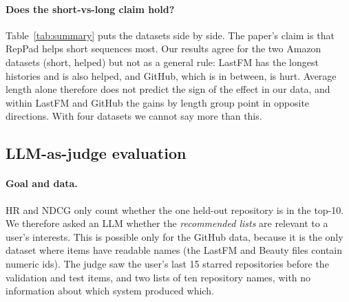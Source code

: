 \documentclass[11pt]{article}
\begin{document}
\paragraph{Does the short-vs-long claim hold?}
Table~\ref{tab:summary} puts the datasets side by side. The paper's claim is that RepPad helps short
sequences most. Our results agree for the two Amazon datasets (short, helped) but not as a general rule:
LastFM has the longest histories and is also helped, and GitHub, which is in between, is hurt. Average
length alone therefore does not predict the sign of the effect in our data, and within LastFM and GitHub the gains
by length group point in opposite directions. With four datasets we cannot say more than this.

\begin{table}[t]
\centering\small
{}
\caption{RepPad vs.\ baseline across datasets (HR@10, relative change). Two values are the first set of
seeds and the later re-runs.}
\label{tab:summary}
\end{table}

\subsection{LLM-as-judge evaluation}
\paragraph{Goal and data.}
HR and NDCG only count whether the one held-out repository is in the top-10. We therefore asked
an LLM whether the \emph{recommended lists} are relevant to a user's interests. This is possible
only for the GitHub data, because it is the only dataset where items have readable names (the
LastFM and Beauty files contain numeric ids). The judge saw the user's last 15 starred repositories
before the validation and test items, and two lists of ten repository names, with no information
about which system produced which.
\end{document}
